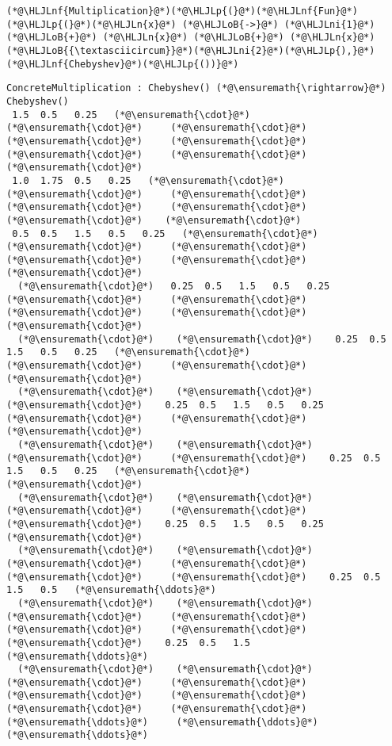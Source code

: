 \documentclass[12pt,landscape]{article}
\newcommand{\HLJLn}[1]{#1}
\newcommand{\HLJLnf}[1]{\textcolor[RGB]{66,102,213}{#1}}
\newcommand{\HLJLni}[1]{\textcolor[RGB]{59,151,46}{#1}}
\newcommand{\HLJLoB}[1]{\textcolor[RGB]{102,102,102}{\textbf{#1}}}
\newcommand{\HLJLp}[1]{#1}
\begin{document}
{\begin{lstlisting}
(*@\HLJLnf{Multiplication}@*)(*@\HLJLp{(}@*)(*@\HLJLnf{Fun}@*)(*@\HLJLp{(}@*)(*@\HLJLn{x}@*) (*@\HLJLoB{->}@*) (*@\HLJLni{1}@*) (*@\HLJLoB{+}@*) (*@\HLJLn{x}@*) (*@\HLJLoB{+}@*) (*@\HLJLn{x}@*)(*@\HLJLoB{{\textasciicircum}}@*)(*@\HLJLni{2}@*)(*@\HLJLp{),}@*)(*@\HLJLnf{Chebyshev}@*)(*@\HLJLp{())}@*)
\end{lstlisting}

\begin{lstlisting}
ConcreteMultiplication : Chebyshev() (*@\ensuremath{\rightarrow}@*) Chebyshev()
 1.5  0.5   0.25   (*@\ensuremath{\cdot}@*)     (*@\ensuremath{\cdot}@*)     (*@\ensuremath{\cdot}@*)     (*@\ensuremath{\cdot}@*)     (*@\ensuremath{\cdot}@*)     (*@\ensuremath{\cdot}@*)     (*@\ensuremath{\cdot}@*)    (*@\ensuremath{\cdot}@*)
 1.0  1.75  0.5   0.25   (*@\ensuremath{\cdot}@*)     (*@\ensuremath{\cdot}@*)     (*@\ensuremath{\cdot}@*)     (*@\ensuremath{\cdot}@*)     (*@\ensuremath{\cdot}@*)     (*@\ensuremath{\cdot}@*)    (*@\ensuremath{\cdot}@*)
 0.5  0.5   1.5   0.5   0.25   (*@\ensuremath{\cdot}@*)     (*@\ensuremath{\cdot}@*)     (*@\ensuremath{\cdot}@*)     (*@\ensuremath{\cdot}@*)     (*@\ensuremath{\cdot}@*)    (*@\ensuremath{\cdot}@*)
  (*@\ensuremath{\cdot}@*)   0.25  0.5   1.5   0.5   0.25   (*@\ensuremath{\cdot}@*)     (*@\ensuremath{\cdot}@*)     (*@\ensuremath{\cdot}@*)     (*@\ensuremath{\cdot}@*)    (*@\ensuremath{\cdot}@*)
  (*@\ensuremath{\cdot}@*)    (*@\ensuremath{\cdot}@*)    0.25  0.5   1.5   0.5   0.25   (*@\ensuremath{\cdot}@*)     (*@\ensuremath{\cdot}@*)     (*@\ensuremath{\cdot}@*)    (*@\ensuremath{\cdot}@*)
  (*@\ensuremath{\cdot}@*)    (*@\ensuremath{\cdot}@*)     (*@\ensuremath{\cdot}@*)    0.25  0.5   1.5   0.5   0.25   (*@\ensuremath{\cdot}@*)     (*@\ensuremath{\cdot}@*)    (*@\ensuremath{\cdot}@*)
  (*@\ensuremath{\cdot}@*)    (*@\ensuremath{\cdot}@*)     (*@\ensuremath{\cdot}@*)     (*@\ensuremath{\cdot}@*)    0.25  0.5   1.5   0.5   0.25   (*@\ensuremath{\cdot}@*)    (*@\ensuremath{\cdot}@*)
  (*@\ensuremath{\cdot}@*)    (*@\ensuremath{\cdot}@*)     (*@\ensuremath{\cdot}@*)     (*@\ensuremath{\cdot}@*)     (*@\ensuremath{\cdot}@*)    0.25  0.5   1.5   0.5   0.25  (*@\ensuremath{\cdot}@*)
  (*@\ensuremath{\cdot}@*)    (*@\ensuremath{\cdot}@*)     (*@\ensuremath{\cdot}@*)     (*@\ensuremath{\cdot}@*)     (*@\ensuremath{\cdot}@*)     (*@\ensuremath{\cdot}@*)    0.25  0.5   1.5   0.5   (*@\ensuremath{\ddots}@*)
  (*@\ensuremath{\cdot}@*)    (*@\ensuremath{\cdot}@*)     (*@\ensuremath{\cdot}@*)     (*@\ensuremath{\cdot}@*)     (*@\ensuremath{\cdot}@*)     (*@\ensuremath{\cdot}@*)     (*@\ensuremath{\cdot}@*)    0.25  0.5   1.5   (*@\ensuremath{\ddots}@*)
  (*@\ensuremath{\cdot}@*)    (*@\ensuremath{\cdot}@*)     (*@\ensuremath{\cdot}@*)     (*@\ensuremath{\cdot}@*)     (*@\ensuremath{\cdot}@*)     (*@\ensuremath{\cdot}@*)     (*@\ensuremath{\cdot}@*)     (*@\ensuremath{\cdot}@*)     (*@\ensuremath{\ddots}@*)     (*@\ensuremath{\ddots}@*)    (*@\ensuremath{\ddots}@*)
\end{lstlisting}


}
\end{document}
